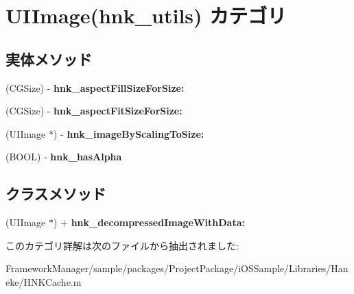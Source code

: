 \hypertarget{category_u_i_image_07hnk__utils_08}{}\section{U\+I\+Image(hnk\+\_\+utils) カテゴリ}
\label{category_u_i_image_07hnk__utils_08}
\subsection*{実体メソッド}
\begin{DoxyCompactItemize}
\item 
\hypertarget{category_u_i_image_07hnk__utils_08_a091d19dd125d32bc3227db900b538c55}{}(C\+G\+Size) -\/ {\bfseries hnk\+\_\+aspect\+Fill\+Size\+For\+Size\+:}\label{category_u_i_image_07hnk__utils_08_a091d19dd125d32bc3227db900b538c55}

\item 
\hypertarget{category_u_i_image_07hnk__utils_08_a51daf12f65804502713c270b0113d204}{}(C\+G\+Size) -\/ {\bfseries hnk\+\_\+aspect\+Fit\+Size\+For\+Size\+:}\label{category_u_i_image_07hnk__utils_08_a51daf12f65804502713c270b0113d204}

\item 
\hypertarget{category_u_i_image_07hnk__utils_08_a20eca7769dd46632308b9be147de6cab}{}(U\+I\+Image $\ast$) -\/ {\bfseries hnk\+\_\+image\+By\+Scaling\+To\+Size\+:}\label{category_u_i_image_07hnk__utils_08_a20eca7769dd46632308b9be147de6cab}

\item 
\hypertarget{category_u_i_image_07hnk__utils_08_a60773b39df294f034871792e360540f8}{}(B\+O\+O\+L) -\/ {\bfseries hnk\+\_\+has\+Alpha}\label{category_u_i_image_07hnk__utils_08_a60773b39df294f034871792e360540f8}

\end{DoxyCompactItemize}
\subsection*{クラスメソッド}
\begin{DoxyCompactItemize}
\item 
\hypertarget{category_u_i_image_07hnk__utils_08_a0ae19f1330630563f87894db996c9708}{}(U\+I\+Image $\ast$) + {\bfseries hnk\+\_\+decompressed\+Image\+With\+Data\+:}\label{category_u_i_image_07hnk__utils_08_a0ae19f1330630563f87894db996c9708}

\end{DoxyCompactItemize}


このカテゴリ詳解は次のファイルから抽出されました\+:\begin{DoxyCompactItemize}
\item 
Framework\+Manager/sample/packages/\+Project\+Package/i\+O\+S\+Sample/\+Libraries/\+Haneke/H\+N\+K\+Cache.\+m\end{DoxyCompactItemize}
